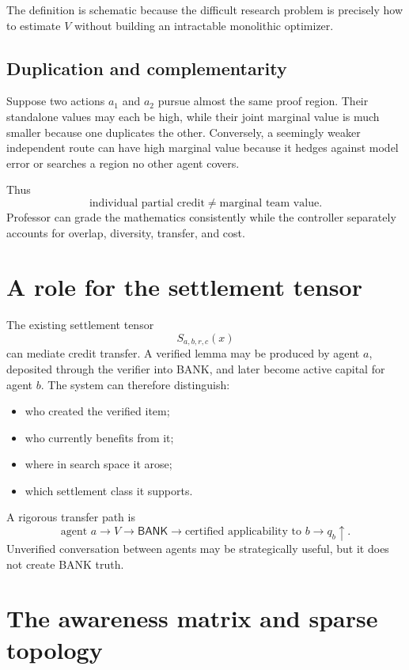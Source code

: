 \documentclass[11pt]{article}
\theoremstyle{definition}
\theoremstyle{remark}
\newcommand{\BANK}{\mathsf{BANK}}
\begin{document}
The definition is schematic because the difficult research problem is precisely how to estimate $V$ without building an intractable monolithic optimizer.

\subsection{Duplication and complementarity}

Suppose two actions $a_1$ and $a_2$ pursue almost the same proof region. Their standalone values may each be high, while their joint marginal value is much smaller because one duplicates the other. Conversely, a seemingly weaker independent route can have high marginal value because it hedges against model error or searches a region no other agent covers.

Thus
\[
\boxed{\text{individual partial credit}\ne\text{marginal team value}.}
\]
Professor can grade the mathematics consistently while the controller separately accounts for overlap, diversity, transfer, and cost.

\section{A role for the settlement tensor}

The existing settlement tensor
\[
S_{a,b,r,c}(x)
\]
can mediate credit transfer. A verified lemma may be produced by agent $a$, deposited through the verifier into BANK, and later become active capital for agent $b$. The system can therefore distinguish:
\begin{itemize}
\item who created the verified item;
\item who currently benefits from it;
\item where in search space it arose;
\item which settlement class it supports.
\end{itemize}

A rigorous transfer path is
\[
\boxed{
\text{agent }a
\longrightarrow V
\longrightarrow \BANK
\longrightarrow\text{certified applicability to }b
\longrightarrow q_b\uparrow.
}
\]
Unverified conversation between agents may be strategically useful, but it does not create BANK truth.

\section{The awareness matrix and sparse topology}
\end{document}

